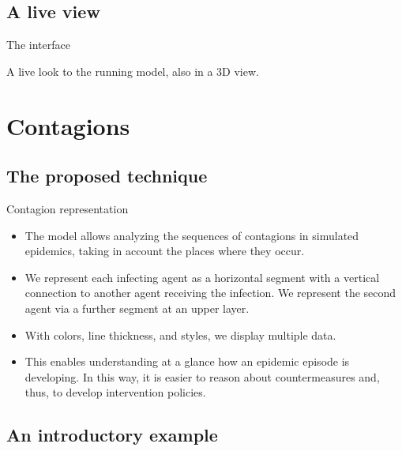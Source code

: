 \documentclass[8pt]{beamer}
\begin{document}
\subsection{A live view}

\begin{frame}{The interface}

\bigskip
A live look to the running model, also in a 3D view.

\end{frame}

\section{Contagions}

\subsection{The proposed technique}

\begin{frame}{Contagion representation}

  \begin{itemize}
  \item
The model allows analyzing the sequences of contagions in simulated epidemics, taking in account the places where they occur. 
  \item
We represent each infecting agent as a horizontal segment with a vertical connection to another agent receiving the infection. 
We represent the second agent via a further segment at an upper layer. 

  \item
With colors, line thickness, and styles, we display multiple data. 

  \item
This enables understanding at a glance how an epidemic episode is developing. In this way, it is easier to reason about countermeasures and, thus, to develop intervention policies.

  \end{itemize}
\end{frame}

\subsection{An introductory example}
\end{document}
